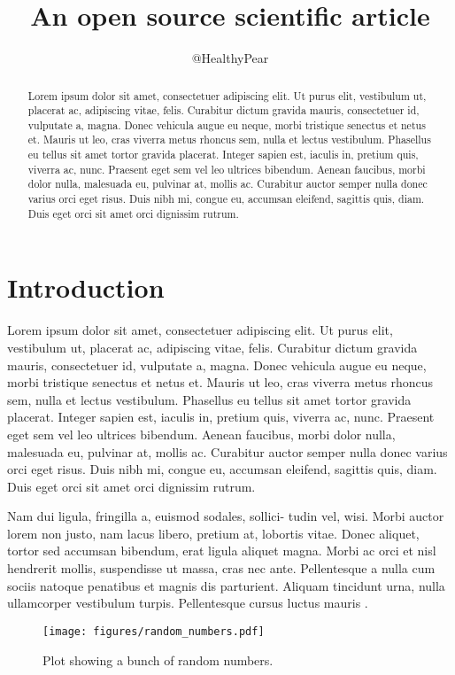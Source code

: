 \documentclass[twocolumn]{aastex631}
\begin{document}
\title{An open source scientific article}

\author{@HealthyPear}

\begin{abstract}
    Lorem ipsum dolor sit amet, consectetuer adipiscing elit.
    Ut purus elit, vestibulum ut, placerat ac, adipiscing vitae, felis.
    Curabitur dictum gravida mauris, consectetuer id, vulputate a, magna.
    Donec vehicula augue eu neque, morbi tristique senectus et netus et.
    Mauris ut leo, cras viverra metus rhoncus sem, nulla et lectus vestibulum.
    Phasellus eu tellus sit amet tortor gravida placerat.
    Integer sapien est, iaculis in, pretium quis, viverra ac, nunc.
    Praesent eget sem vel leo ultrices bibendum.
    Aenean faucibus, morbi dolor nulla, malesuada eu, pulvinar at, mollis ac.
    Curabitur auctor semper nulla donec varius orci eget risus.
    Duis nibh mi, congue eu, accumsan eleifend, sagittis quis, diam.
    Duis eget orci sit amet orci dignissim rutrum.
\end{abstract}

\section{Introduction}
\label{sec:intro}

Lorem ipsum dolor sit amet, consectetuer adipiscing elit.
Ut purus elit, vestibulum ut, placerat ac, adipiscing vitae, felis.
Curabitur dictum gravida mauris, consectetuer id, vulputate a, magna.
Donec vehicula augue eu neque, morbi tristique senectus et netus et.
Mauris ut leo, cras viverra metus rhoncus sem, nulla et lectus vestibulum.
Phasellus eu tellus sit amet tortor gravida placerat.
Integer sapien est, iaculis in, pretium quis, viverra ac, nunc.
Praesent eget sem vel leo ultrices bibendum.
Aenean faucibus, morbi dolor nulla, malesuada eu, pulvinar at, mollis ac.
Curabitur auctor semper nulla donec varius orci eget risus.
Duis nibh mi, congue eu, accumsan eleifend, sagittis quis, diam.
Duis eget orci sit amet orci dignissim rutrum.

Nam dui ligula, fringilla a, euismod sodales, sollici- tudin vel, wisi.
Morbi auctor lorem non justo, nam lacus libero, pretium at, lobortis vitae.
Donec aliquet, tortor sed accumsan bibendum, erat ligula aliquet magna.
Morbi ac orci et nisl hendrerit mollis, suspendisse ut massa, cras nec ante.
Pellentesque a nulla cum sociis natoque penatibus et magnis dis parturient.
Aliquam tincidunt urna, nulla ullamcorper vestibulum turpis.
Pellentesque cursus luctus mauris \citep{Luger2021}.

\begin{figure}[ht!]
    \begin{centering}
        \texttt{[image: figures/random\_numbers.pdf]}
        \caption{
            Plot showing a bunch of random numbers.
        }
        \label{fig:random_numbers}
    \end{centering}
\end{figure}


\end{document}
